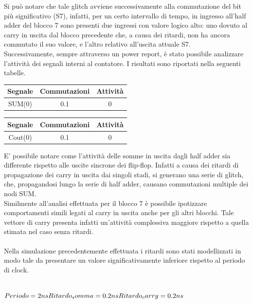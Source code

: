 \documentclass[10pt,  english, makeidx, a4paper, titlepage, oneside]{book}
\begin{document}
Si può notare che tale glitch avviene successivamente alla commutazione
del bit più significativo (S7), infatti, per un certo intervallo di tempo,
in ingresso all'half adder del blocco 7 sono presenti due ingressi con valore
logico alto: uno dovuto al carry in uscita dal blocco precedente che, a causa
dei ritardi, non ha ancora commutato il suo valore, e l'altro relativo all'uscita
attuale S7.
\\
Successivamente, sempre attraverso un power report, è stato possibile
analizzare l'attività dei segnali interni al contatore. I risultati sono 
riportati nella seguenti tabelle.
\\
\begin{center}
	\begin{tabular}{|c|c|c|}
	\hline
	Segnale & Commutazioni & Attività \\ 
	\hline
	SUM(0) & 0.1 & 0 \\
	\hline
	\end{tabular}	
	\begin{tabular}{|c|c|c|}
	\hline
	Segnale & Commutazioni & Attività \\ 
	\hline
	Cout(0) & 0.1 & 0 \\
	\hline
	\end{tabular}
\end{center}
\vspace{0.3cm}
E' possibile notare come l'attività delle somme in uscita dagli
half adder sia differente rispetto alle uscite sincrone dei flip-flop.
Infatti a causa dei ritardi di propagazione dei carry in uscita dai 
singoli stadi, si generano una serie di glitch, che, propagandosi lungo
la serie di half adder, causano commutazioni multiple dei nodi SUM.
\\
Similmente all'analisi effettuata per il blocco 7 è possibile ipotizzare
comportamenti simili legati al carry in uscita anche per gli altri blocchi.
Tale vettore di carry presenta infatti un'attività complessiva maggiore 
rispetto a quella stimata nel caso senza ritardi.
\\\\
Nella simulazione precedentemente effettuata i ritardi sono stati
modellizzati in modo tale da presentare un valore significativamente
inferiore rispetto al periodo di clock.
\\\\
\centerline{$Periodo = 2ns \\
            Ritardo_somma = 0.2ns \\
            Ritardo_carry = 0.2ns $}
\\\\
\end{document}
